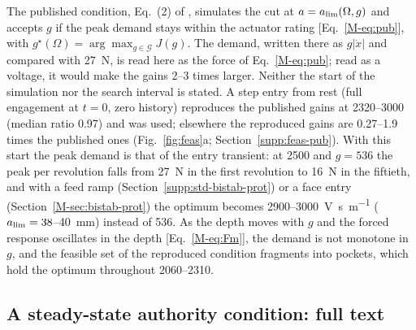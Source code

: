 The published condition, Eq.~(2) of \citet{ozsoy2026robust}, simulates the cut at $a=a_{\lim}(\Omega,g)$ and accepts $g$ if the peak demand stays within the actuator rating [Eq.~\eqref{M-eq:pub}], with $g^\star(\Omega)=\arg\max_{g\in\mathcal G}J(g)$. The demand, written there as $g\lvert\dot x\rvert$ and compared with \SI{27}{\newton}, is read here as the force of Eq.~\eqref{M-eq:pub}; read as a voltage, it would make the gains 2--3 times larger. Neither the start of the simulation nor the search interval is stated. A step entry from rest (full engagement at $t=0$, zero history) reproduces the published gains at \SIrange{2320}{3000}{\rpm} (median ratio 0.97) and was used; elsewhere the reproduced gains are 0.27--1.9 times the published ones (Fig.~\ref{fig:feas}a; Section~\ref{supp:feas-pub}). With this start the peak demand is that of the entry transient: at \SI{2500}{\rpm} and $g=536$ the peak per revolution falls from \SI{27}{\newton} in the first revolution to \SI{16}{\newton} in the fiftieth, and with a feed ramp (Section~\ref{supp:std-bistab-prot}) or a face entry (Section~\ref{M-sec:bistab-prot}) the optimum becomes 2900--\SI{3000}{\volt\second\per\metre} ($a_{\lim}=38$--\SI{40}{\milli\metre}) instead of 536. As the depth moves with $g$ and the forced response oscillates in the depth [Eq.~\eqref{M-eq:Fm}], the demand is not monotone in $g$, and the feasible set of the reproduced condition fragments into pockets, which hold the optimum throughout 2060--\SI{2310}{\rpm}.

\subsection{A steady-state authority condition: full text}\label{supp:std-feas-new}

